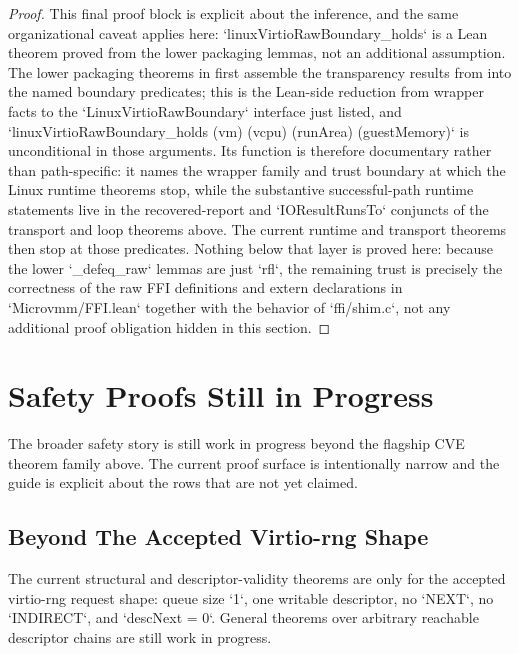 \begin{proof}
\leanok
{}
This final proof block is explicit about the inference, and the same organizational caveat applies here: `linuxVirtioRawBoundary_holds` is a Lean theorem proved from the lower packaging lemmas, not an additional assumption.
The lower packaging theorems in  first assemble the transparency results from  into the named boundary predicates; this is the Lean-side reduction from wrapper facts to the `LinuxVirtioRawBoundary` interface just listed, and `linuxVirtioRawBoundary_holds (vm) (vcpu) (runArea) (guestMemory)` is unconditional in those arguments.
Its function is therefore documentary rather than path-specific: it names the wrapper family and trust boundary at which the Linux runtime theorems stop, while the substantive successful-path runtime statements live in the recovered-report and `IOResultRunsTo` conjuncts of the transport and loop theorems above.
The current runtime and transport theorems then stop at those predicates.
Nothing below that layer is proved here: because the lower `_defeq_raw` lemmas are just `rfl`, the remaining trust is precisely the correctness of the raw FFI definitions and extern declarations in `Microvmm/FFI.lean` together with the behavior of `ffi/shim.c`, not any additional proof obligation hidden in this section.
\end{proof}

\chapter{Safety Proofs Still in Progress}

The broader safety story is still work in progress beyond the flagship CVE theorem family above.
The current proof surface is intentionally narrow and the guide is explicit about the rows that are not yet claimed.

\section{Beyond The Accepted Virtio-rng Shape}

The current structural and descriptor-validity theorems are only for the accepted virtio-rng request shape: queue size `1`, one writable descriptor, no `NEXT`, no `INDIRECT`, and `descNext = 0`.
General theorems over arbitrary reachable descriptor chains are still work in progress.

